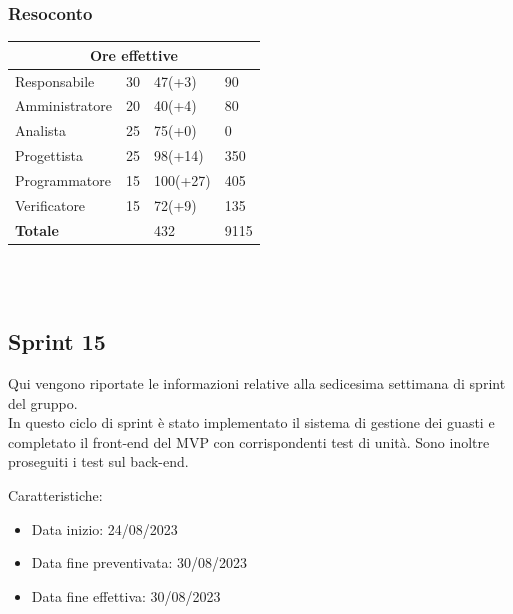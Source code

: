 \documentclass[9pt]{article}
\begin{document}
\subsubsection{Resoconto}
\begin{center}
	\begin{tabularx}{\textwidth}{|X|X|X|X|}
		\hline														
		\multicolumn{4}{|c|}{\textbf{Ore effettive}}                                      \\														
		\hline														
		Responsabile		&		30		&		47(+3)		&		90		\\
		\hline														
		Amministratore		&		20		&		40(+4)		&		80		\\
		\hline														
		Analista		&		25		&		75(+0)		&		0		\\
		\hline														
		Progettista		&		25		&		98(+14)		&		350		\\
		\hline														
		Programmatore		&		15		&		100(+27)		&		405		\\
		\hline														
		Verificatore		&		15		&		72(+9)		&		135		\\
		\hline														
		\hline														
		\textbf{Totale}		&				&		432		&		9115		\\
		\hline																																							
	\end{tabularx}\\[8pt]
	\mbox{}\\
\end{center}

\subsection{Sprint 15}
Qui vengono riportate le informazioni relative alla sedicesima settimana di sprint del gruppo. \\
In questo ciclo di sprint è stato implementato il sistema di gestione dei guasti e completato il front-end del MVP con corrispondenti test di unità.
Sono inoltre proseguiti i test sul back-end.

Caratteristiche:

\begin{itemize}
	\item Data inizio: 24/08/2023
	\item Data fine preventivata: 30/08/2023
	\item Data fine effettiva: 30/08/2023
\end{itemize}
\end{document}
